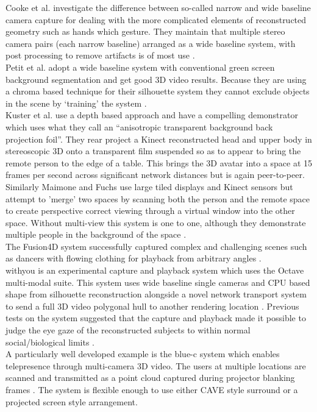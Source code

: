     
                        Cooke et al. investigate the difference between so-called narrow and wide baseline camera capture for dealing with the more complicated elements of reconstructed geometry such as hands which gesture. They maintain that multiple stereo camera pairs (each narrow baseline) arranged as a wide baseline system, with post processing to remove artifacts is of most use \cite{Cooke_image-basedrendering}.\\
                        Petit et al. adopt a wide baseline system with conventional green screen background segmentation and get good 3D video results. Because they are using a chroma based technique for their silhouette system they cannot exclude objects in the scene by `training' the system \cite{Petit2010}.\\
Kuster et al. use a depth based approach and have a compelling demonstrator which uses what they call an ``anisotropic transparent background back projection foil''. They rear project a Kinect reconstructed head and upper body in stereoscopic 3D onto a transparent film suspended so as to appear to bring the remote person to the edge of a table. This brings the 3D avatar into a space at 15 frames per second across significant network distances but is again peer-to-peer\cite{Kuster2012a}.\\
Similarly Maimone and Fuchs use large tiled displays and Kinect sensors but attempt to 'merge' two spaces by scanning both the person and the remote space to create perspective correct viewing through a virtual window into the other space. Without multi-view this system is one to one, although they demonstrate multiple people in the background of the space \cite{Maimone2011a}.\\
       The Fusion4D system successfully captured complex and challenging scenes such as dancers with flowing clothing for playback from arbitrary angles \cite{Dou2016}.\\
withyou is an experimental capture and playback system which uses the Octave multi-modal suite. This system uses wide baseline single cameras and CPU based shape from silhouette reconstruction alongside a novel network transport system to send a full 3D video polygonal hull to another rendering location \cite{Roberts2015}. Previous tests on the system suggested that the capture and playback made it possible to judge the eye gaze of the reconstructed subjects to within normal social/biological limits \cite{Roberts2013}.\\
A particularly well developed example is the blue-c system which enables telepresence through multi-camera 3D video. The users at multiple locations are scanned and transmitted as a point cloud captured during projector blanking frames \cite{Gross2003}. The system is flexible enough to use either CAVE style surround or a projected screen style arrangement.\\
